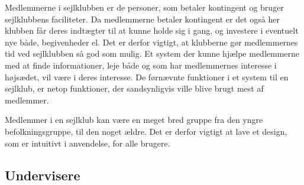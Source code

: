 Medlemmerne i sejlklubben er de personer, som betaler kontingent og bruger sejlklubbens faciliteter.
Da medlemmerne betaler kontingent er det også her klubben får deres indtægter til at kunne holde sig i gang, og investere i
eventuelt nye både, begivenheder el. Det er derfor vigtigt, at klubberne gør medlemmernes tid ved sejlklubben så god som mulig. Et system der kunne
hjælpe medlemmerne med at finde informationer, leje både og som har medlemmernes interesse i højsædet, vil
være i deres interesse. De førnævnte funktioner i et system til en sejlklub, er netop funktioner, der
sandsynligvis ville blive brugt mest af medlemmer.

Medlemmer i en sejlklub kan være en meget bred gruppe fra den yngre befolkningsgruppe, til den noget ældre.
Det er derfor vigtigt at lave et design, som er intuitivt i anvendelse, for alle brugere.





\subsection{Undervisere}

